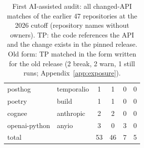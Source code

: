 \documentclass[11pt]{article}
\begin{document}
\begin{table}[t]
\begin{minipage}[t]{0.47\textwidth}
\begin{tabular}{llcccc}
posthog & temporalio & 1 & 1 & 0 & 0 \\
poetry & build & 1 & 1 & 0 & 0 \\
cognee & anthropic & 2 & 2 & 0 & 0 \\
openai-python & anyio & 3 & 0 & 3 & 0 \\
\midrule
total & & 53 & 46 & 7 & 5 \\
\bottomrule
\end{tabular}
\caption{First AI-assisted audit: all changed-API matches of the earlier 47 repositories at the 2026 cutoff (repository names without owners). TP: the code references the API and the change exists in the pinned release. Old form: TP matched in the form written for the old release (2 break, 2 warn, 1 still runs; Appendix~\ref{app:exposure}).}
\label{tab:audit}
\end{minipage}
\end{table}
\end{document}
